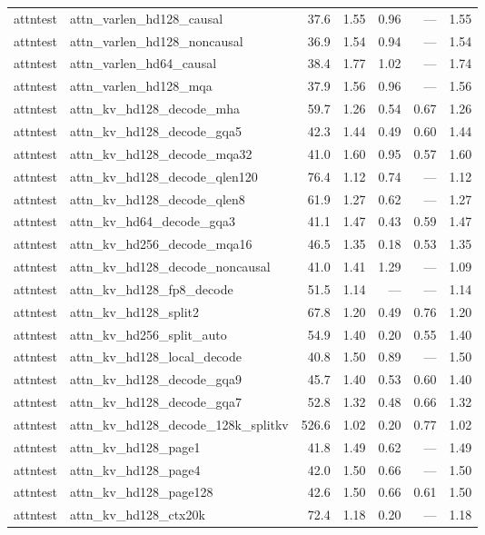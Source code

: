 \begin{longtable}{@{}llrrrrr@{}}
attntest & attn\_varlen\_hd128\_causal & 37.6 & 1.55 & 0.96 & --- & 1.55 \\
attntest & attn\_varlen\_hd128\_noncausal & 36.9 & 1.54 & 0.94 & --- & 1.54 \\
attntest & attn\_varlen\_hd64\_causal & 38.4 & 1.77 & 1.02 & --- & 1.74 \\
attntest & attn\_varlen\_hd128\_mqa & 37.9 & 1.56 & 0.96 & --- & 1.56 \\
attntest & attn\_kv\_hd128\_decode\_mha & 59.7 & 1.26 & 0.54 & 0.67 & 1.26 \\
attntest & attn\_kv\_hd128\_decode\_gqa5 & 42.3 & 1.44 & 0.49 & 0.60 & 1.44 \\
attntest & attn\_kv\_hd128\_decode\_mqa32 & 41.0 & 1.60 & 0.95 & 0.57 & 1.60 \\
attntest & attn\_kv\_hd128\_decode\_qlen120 & 76.4 & 1.12 & 0.74 & --- & 1.12 \\
attntest & attn\_kv\_hd128\_decode\_qlen8 & 61.9 & 1.27 & 0.62 & --- & 1.27 \\
attntest & attn\_kv\_hd64\_decode\_gqa3 & 41.1 & 1.47 & 0.43 & 0.59 & 1.47 \\
attntest & attn\_kv\_hd256\_decode\_mqa16 & 46.5 & 1.35 & 0.18 & 0.53 & 1.35 \\
attntest & attn\_kv\_hd128\_decode\_noncausal & 41.0 & 1.41 & 1.29 & --- & 1.09 \\
attntest & attn\_kv\_hd128\_fp8\_decode & 51.5 & 1.14 & --- & --- & 1.14 \\
attntest & attn\_kv\_hd128\_split2 & 67.8 & 1.20 & 0.49 & 0.76 & 1.20 \\
attntest & attn\_kv\_hd256\_split\_auto & 54.9 & 1.40 & 0.20 & 0.55 & 1.40 \\
attntest & attn\_kv\_hd128\_local\_decode & 40.8 & 1.50 & 0.89 & --- & 1.50 \\
attntest & attn\_kv\_hd128\_decode\_gqa9 & 45.7 & 1.40 & 0.53 & 0.60 & 1.40 \\
attntest & attn\_kv\_hd128\_decode\_gqa7 & 52.8 & 1.32 & 0.48 & 0.66 & 1.32 \\
attntest & attn\_kv\_hd128\_decode\_128k\_splitkv & 526.6 & 1.02 & 0.20 & 0.77 & 1.02 \\
attntest & attn\_kv\_hd128\_page1 & 41.8 & 1.49 & 0.62 & --- & 1.49 \\
attntest & attn\_kv\_hd128\_page4 & 42.0 & 1.50 & 0.66 & --- & 1.50 \\
attntest & attn\_kv\_hd128\_page128 & 42.6 & 1.50 & 0.66 & 0.61 & 1.50 \\
attntest & attn\_kv\_hd128\_ctx20k & 72.4 & 1.18 & 0.20 & --- & 1.18 \\

\end{longtable}
